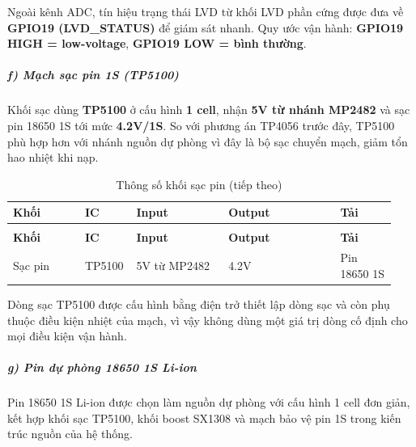 \documentclass[a4paper]{extarticle}
\newcommand{\thesissettableid}[2]{%
  \renewcommand{\thetable}{#1}%
  \renewcommand{\theHtable}{#2}%
}
\begin{document}
Ngoài kênh ADC, tín hiệu trạng thái LVD từ khối LVD phần cứng được đưa về
\textbf{GPIO19 (LVD\_STATUS)} để giám sát nhanh. Quy ước vận hành:
\textbf{GPIO19 HIGH = low-voltage}, \textbf{GPIO19 LOW = bình thường}.

\subparagraph{f) Mạch sạc pin 1S
(TP5100)}\label{f-mux1ea1ch-sux1ea1c-pin-1s-tp4056}

Khối sạc dùng \textbf{TP5100} ở cấu hình \textbf{1 cell}, nhận
\textbf{5V từ nhánh MP2482} và sạc pin 18650 1S tới mức
\textbf{4.2V/1S}. So với phương án TP4056 trước đây, TP5100 phù hợp hơn
với nhánh nguồn dự phòng vì đây là bộ sạc chuyển mạch, giảm tổn hao
nhiệt khi nạp.


{\thesissettableid{3.13}{tab-ch3-thong-so-khoi-sac-pin}
\def\LTcaptype{table}
\begin{longtable}{|L{0.189\linewidth}|L{0.094\linewidth}|L{0.236\linewidth}|L{0.283\linewidth}|L{0.142\linewidth}|}
\caption{Thông số khối sạc pin}\label{tab:ch3-thong-so-khoi-sac-pin}\\
\hline \textbf{Khối} & \textbf{IC} & \textbf{Input} & \textbf{Output} & \textbf{Tải} \\
\hline
\endfirsthead
\caption[]{Thông số khối sạc pin (tiếp theo)}\\
\hline \textbf{Khối} & \textbf{IC} & \textbf{Input} & \textbf{Output} & \textbf{Tải} \\
\hline
\endhead
\hline
\endfoot
\endlastfoot
Sạc pin & TP5100 & 5V từ MP2482 & 4.2V & Pin 18650 1S \\\hline
\end{longtable}
}


Dòng sạc TP5100 được cấu hình bằng điện trở thiết lập dòng sạc và còn
phụ thuộc điều kiện nhiệt của mạch, vì vậy không dùng một giá trị dòng
cố định cho mọi điều kiện vận hành.

\subparagraph{g) Pin dự phòng 18650 1S
Li-ion}\label{g-pin-dux1ef1-phuxf2ng-18650-1s-li-ion}

Pin 18650 1S Li-ion được chọn làm nguồn dự phòng với cấu hình 1 cell đơn
giản, kết hợp khối sạc TP5100, khối boost SX1308 và mạch bảo vệ pin 1S
trong kiến trúc nguồn của hệ thống.
\end{document}
